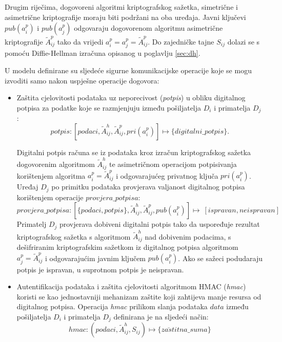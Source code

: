 Drugim riječima, dogovoreni algoritmi kriptografskog sažetka, simetrične i
asimetrične kriptografije moraju biti podržani na oba uređaja.
Javni ključevi $pub(a^p_i)$ i $pub(a^p_j)$ odgovaraju dogovorenom algoritmu
asimetrične kriptografije $\widetilde{A}^p_{ij}$ tako da vrijedi
$a^p_i=a^p_j=\widetilde{A}^p_{ij}$. Do zajedničke tajne $S_{ij}$ dolazi se s
pomoću Diffie-Hellman izračuna opisanog u poglavlju \ref{sec:dh}.


U modelu definirane su sljedeće sigurne komunikacijske operacije koje se
mogu izvoditi samo nakon uspješne operacije dogovora:
\begin{itemize}  
    \item Zaštita cjelovitosti podataka uz neporecivost (\textit{potpis}) u obliku
	digitalnog potpisa za podatke koje se razmjenjuju između pošiljatelja
	$D_i$ i primatelja $D_j$:
	\begin{equation}
	    \mathit{potpis}:[podaci,\widetilde{A}^h_{ij},\widetilde{A}^p_{ij},pri(a^p_i)]\longmapsto\{\mathit{digitalni\_potpis}\}.
	    \label{eq:sign}
	\end{equation}
	    
	Digitalni potpis računa se iz podataka kroz izračun
	kriptografskog sažetka dogovorenim algoritmom $\widetilde{A}^h_{ij}$ te
	asimetričnom operacijom potpisivanja korištenjem algoritma
	$a^p_i=\widetilde{A}^p_{ij}$ i odgovarajućeg privatnog ključa
	$pri(a^p_i)$. Uređaj $D_j$ po primitku podataka provjerava valjanost
	digitalnog potpisa korištenjem operacije $provjera\_potpisa$:
	\begin{equation}
	    \mathit{provjera\_potpisa}:[\{podaci,\mathit{potpis}\},\widetilde{A}^h_{ij},\widetilde{A}^p_{ij},pub(a^p_i)]\longmapsto~[ispravan,neispravan]
	\end{equation}
	Primatelj $D_j$ provjerava dobiveni digitalni potpis tako
	da uspoređuje rezultat kriptografskog sažetka s algoritmom
	$\widetilde{A}^h_{ij}$ nad dobivenim podacima,
	s dešifriranim kriptografskim sažetkom iz digitalnog potpisa
	algoritmom $a^p_j=\widetilde{A}^p_{ij}$ i odgovarajućim
	javnim ključem $pub(a^p_i)$. Ako se sažeci podudaraju potpis je
	ispravan, u suprotnom potpis je neispravan.

    \item Autentifikacija podataka i zaštita cjelovitosti algoritmom HMAC
	(\textit{hmac}) koristi se kao jednostavniji mehanizam zaštite koji
	zahtijeva manje resursa od digitalnog potpisa. Operacija \emph{hmac}
	prilikom slanja podataka $data$ između pošiljatelja $D_i$ i primatelja
	$D_j$ definirana je na sljedeći način:
	\begin{equation}
	    hmac:(podaci,\widetilde{A}^h_{ij},S_{ij})\longmapsto\{za\breve{s}titna\_suma\}
	    \label{eq:hmac}
	\end{equation}
	

\end{itemize}
